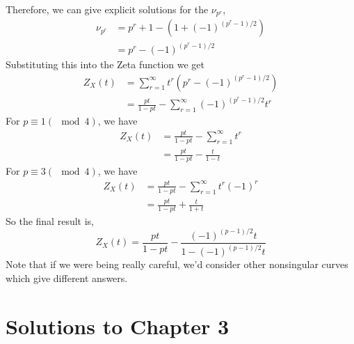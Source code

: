 \documentclass{article}
\begin{document}
Therefore, we can give explicit solutions for the \(\nu_{p^{r}}\),
\begin{subequations}
\begin{align}
\nu_{p^{r}} & = p^{r} + 1 - (1 + (-1)^{(p^{r} - 1)/2}) \\
& = p^{r} - (-1)^{(p^{r}-1)/2}
\end{align}
\end{subequations}
Substituting this into the Zeta function we get
\begin{subequations}
\begin{align}
Z_{X}(t) & = \sum_{r=1}^{\infty} t^{r}(p^{r} - (-1)^{(p^{r}-1)/2}) \\
& = \frac{pt}{1-pt} - \sum_{r=1}^{\infty}(-1)^{(p^{r}-1)/2}t^{r}
\end{align}
\end{subequations}
For \(p \equiv 1 (\mod 4)\), we have
\begin{subequations}
\begin{align}
Z_{X}(t) & =  \frac{pt}{1-pt} - \sum_{r=1}^{\infty}t^{r} \\
& = \frac{pt}{1-pt} - \frac{t}{1-t}
\end{align}
\end{subequations}
For \(p \equiv 3 (\mod 4)\), we have
\begin{subequations}
\begin{align}
Z_{X}(t) & =  \frac{pt}{1-pt} - \sum_{r=1}^{\infty}t^{r}(-1)^{r} \\
& = \frac{pt}{1-pt} + \frac{t}{1+t}
\end{align}
\end{subequations}
So the final result is,
\begin{equation}
Z_{X}(t) =  \frac{pt}{1-pt} - \frac{(-1)^{(p-1)/2}t}{1-(-1)^{(p-1)/2}t}
\end{equation}
Note that if we were being really careful, we'd consider other nonsingular curves which give different answers.

\section{Solutions to Chapter 3}

\subsection{}

\subsection{}
\end{document}
